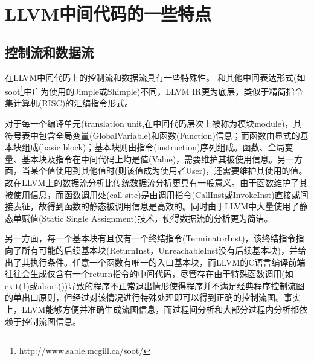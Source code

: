\chapter{LLVM中间代码的一些特点}
\label{chap:IR}

\section{控制流和数据流}
\label{sec:df_cf}

在LLVM中间代码上的控制流和数据流具有一些特殊性。 和其他中间表达形式(如soot\footnote{http://www.sable.mcgill.ca/soot/}中广为使用的Jimple或Shimple)不同，LLVM IR更为底层，类似于精简指令集计算机(RISC)的汇编指令形式。

对于每一个编译单元(translation unit,在中间代码层次上被称为模块module)，其符号表中包含全局变量(GlobalVariable)和函数(Function)信息；而函数由显式的基本块组成(basic block)；基本块则由指令(instruction)序列组成。函数、全局变量、基本块及指令在中间代码上均是值(Value)，需要维护其被使用信息。另一方面，当某个值使用到其他值时(则该值成为使用者User)，还需要维护其使用的值。故在LLVM上的数据流分析比传统数据流分析更具有一般意义。由于函数维护了其被使用信息，而函数调用处(call site)是由调用指令(CallInst或InvokeInst)直接或间接表征，故得到函数的静态被调用信息是高效的。同时由于LLVM中大量使用了静态单赋值(Static Single Assignment)技术，使得数据流的分析更为简洁。

另一方面，每一个基本块有且仅有一个终结指令(TerminatorInst)，该终结指令指向了所有可能的后续基本块(ReturnInst，UnreachableInst没有后续基本块)，并给出了其执行条件。任意一个函数有唯一的入口基本块，而LLVM的C语言编译前端往往会生成仅含有一个return指令的中间代码，尽管存在由于特殊函数调用(如exit(1)或abort())导致的程序不正常退出情形使得程序并不满足经典程序控制流图的单出口原则，但经过对该情况进行特殊处理即可以得到正确的控制流图。事实上，LLVM能够方便并准确生成流图信息，而过程间分析和大部分过程内分析都依赖于控制流图信息。


